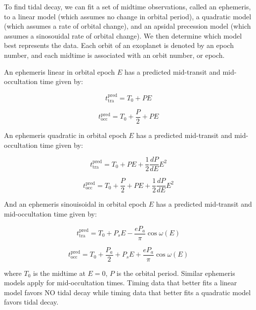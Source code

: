 \documentclass[oneside,12pt]{amsart}
\numberwithin{page}{section}
\begin{document}
To find tidal decay, we can fit a set of midtime observations, called an ephemeris, to a linear model (which assumes no change in orbital period), a quadratic model (which assumes a rate of orbital change), and an apsidal precession model (which assumes a sinosouidal rate of orbital change). We then determine which model best represents the data. Each orbit of an exoplanet is denoted by an epoch number, and each midtime is associated with an orbit number, or epoch. 

An ephemeris linear in orbital epoch $E$ has a predicted mid-transit and mid-occultation time given by:

\begin{equation}
    t_{\text{tra}}^{\text{pred}} = T_0 + PE
\end{equation}

\begin{equation}
    t_{\text{occ}}^{\text{pred}} = T_0 + \frac{P}{2} + PE
\end{equation}

An ephemeris quadratic in orbital epoch $E$ has a predicted mid-transit and mid-occultation time given by:

\begin{equation}
    t_{\text{tra}}^{\text{pred}} = T_0 + PE + \frac{1}{2}\frac{dP}{dE}E^2 
\end{equation}

\begin{equation}
    t_{\text{occ}}^{\text{pred}} = T_0 + \frac{P}{2} + PE + \frac{1}{2}\frac{dP}{dE}E^2 
\end{equation}

And an ephemeris sinouisoidal in orbital epoch $E$ has a predicted mid-transit and mid-occultation time given by:

\begin{equation}
    t_{\text{tra}}^{\text{pred}} = T_0 + P_sE - \frac{eP_a}{\pi} \cos\omega(E)
\end{equation}

\begin{equation}
    t_{\text{occ}}^{\text{pred}} = T_0 + \frac{P_a}{2} + P_sE + \frac{eP_a}{\pi} \cos\omega(E)
\end{equation}

where $T_0$ is the midtime at $E = 0$, $P$ is the orbital period. Similar ephemeris models apply for mid-occultation times. Timing data that better fits a linear model favors NO tidal decay while timing data that better fits a quadratic model favors tidal decay.
\end{document}
